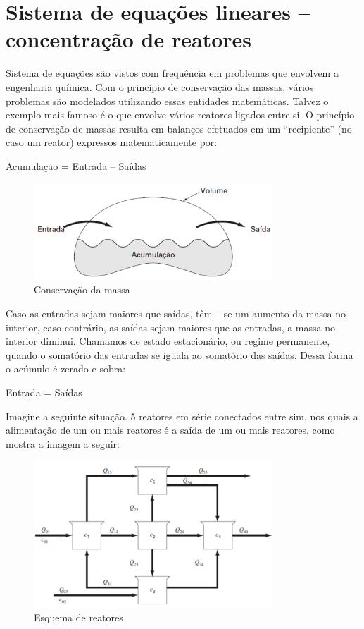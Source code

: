 \section{Sistema de equações lineares – concentração de reatores}

Sistema de equações são vistos com frequência em problemas que envolvem a engenharia química. Com o princípio de conservação das massas, vários problemas são modelados utilizando essas entidades matemáticas. Talvez o exemplo mais famoso é o que envolve vários reatores ligados entre si. O princípio de conservação de massas resulta em balanços efetuados em um “recipiente” (no caso um reator) expressos matematicamente por:

\begin{center}
	Acumulação = Entrada – Saídas
\end{center}

\begin{figure}[H]
	\centering
	\includegraphics[width=0.8\textwidth]{./Imagens/Sistema de eq/sis1.png}
	\caption{Conservação da massa}
	\label{fig:sis1}
\end{figure}

Caso as entradas sejam maiores que saídas, têm – se um aumento da massa no interior, caso contrário, as saídas sejam maiores que as entradas, a massa no interior diminui. Chamamos de estado estacionário, ou regime permanente, quando o somatório das entradas se iguala ao somatório das saídas. Dessa forma o acúmulo é zerado e sobra:

\begin{center}
Entrada = Saídas
\end{center}

Imagine a seguinte situação. 5 reatores em série conectados entre sim, nos quais a alimentação de um ou mais reatores é a saída de um ou mais reatores, como mostra a imagem a seguir:

\begin{figure}[H]
	\centering
	\includegraphics[width=0.8\textwidth]{./Imagens/Sistema de eq/sis2.png}
	\caption{Esquema de reatores}
	\label{fig:sis2}
\end{figure}

